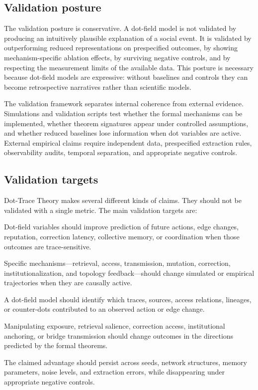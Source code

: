 \documentclass[11pt]{article}
\theoremstyle{remark}
\begin{document}
\subsection{Validation posture}\label{validation-posture}

The validation posture is conservative. A dot-field model is not validated by producing an intuitively plausible explanation of a social event. It is validated by outperforming reduced representations on prespecified outcomes, by showing mechanism-specific ablation effects, by surviving negative controls, and by respecting the measurement limits of the available data. This posture is necessary because dot-field models are expressive: without baselines and controls they can become retrospective narratives rather than scientific models.


The validation framework separates internal coherence from external evidence.
Simulations and validation scripts test whether the formal mechanisms can be
implemented, whether theorem signatures appear under controlled assumptions, and
whether reduced baselines lose information when dot variables are active. External
empirical claims require independent data, prespecified extraction rules,
observability audits, temporal separation, and appropriate negative controls.

\subsection{Validation targets}\label{validation-targets}

Dot-Trace Theory makes several different kinds of claims. They should not be
validated with a single metric. The main validation targets are:

\begin{description}[leftmargin=3.2cm,style=nextline]
\item[Representational value]
Dot-field variables should improve prediction of future actions, edge changes,
reputation, correction latency, collective memory, or coordination when those
outcomes are trace-sensitive.

\item[Mechanistic value]
Specific mechanisms---retrieval, access, transmission, mutation, correction,
institutionalization, and topology feedback---should change simulated or
empirical trajectories when they are causally active.

\item[Explanatory value]
A dot-field model should identify which traces, sources, access relations,
lineages, or counter-dots contributed to an observed action or edge change.

\item[Interventional value]
Manipulating exposure, retrieval salience, correction access, institutional
anchoring, or bridge transmission should change outcomes in the directions
predicted by the formal theorems.

\item[Robustness value]
The claimed advantage should persist across seeds, network structures, memory
parameters, noise levels, and extraction errors, while disappearing under
appropriate negative controls.
\end{description}
\end{document}
